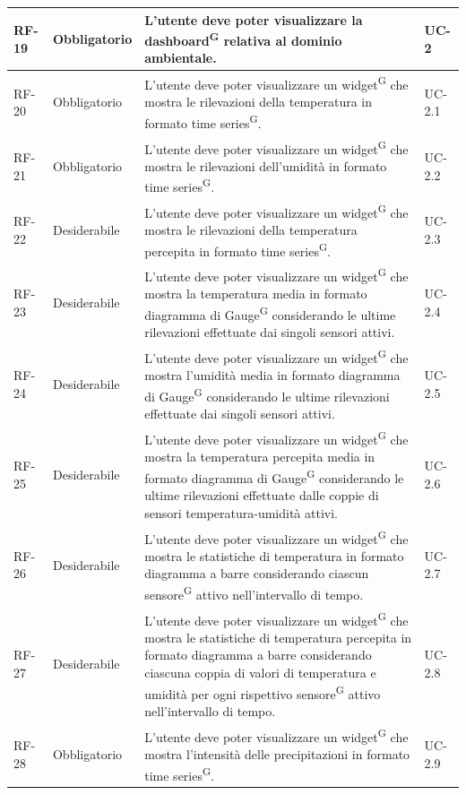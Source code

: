 \documentclass[8pt]{article}
\newcommand{\glossterm}[1]{#1\textsuperscript{G}} %
\begin{document}
\begin{longtable}{|>{\centering\arraybackslash}p{1.2cm}|>{\centering\arraybackslash}p{2cm}|>{\centering\arraybackslash}p{8.5cm}|>{\centering\arraybackslash}p{3cm}|}
            RF-19 & Obbligatorio & L'utente deve poter visualizzare la \glossterm{dashboard} relativa al dominio ambientale. & UC-2 \\ \hline
            RF-20 & Obbligatorio & L'utente deve poter visualizzare un \glossterm{widget} che mostra le rilevazioni della temperatura in formato \glossterm{time series}. & UC-2.1 \\ \hline
            RF-21 & Obbligatorio & L'utente deve poter visualizzare un \glossterm{widget} che mostra le rilevazioni dell'umidità in formato \glossterm{time series}. & UC-2.2 \\ \hline
            RF-22 & Desiderabile & L'utente deve poter visualizzare un \glossterm{widget} che mostra le rilevazioni della temperatura percepita in formato \glossterm{time series}. & UC-2.3 \\ \hline
            RF-23 & Desiderabile & L'utente deve poter visualizzare un \glossterm{widget} che mostra la temperatura media in formato diagramma di \glossterm{Gauge} considerando le ultime rilevazioni effettuate dai singoli sensori attivi. & UC-2.4 \\ \hline
            RF-24 & Desiderabile & L'utente deve poter visualizzare un \glossterm{widget} che mostra l'umidità media in formato diagramma di \glossterm{Gauge} considerando le ultime rilevazioni effettuate dai singoli sensori attivi. & UC-2.5 \\ \hline
            RF-25 & Desiderabile & L'utente deve poter visualizzare un \glossterm{widget} che mostra la temperatura percepita media in formato diagramma di \glossterm{Gauge} considerando le ultime rilevazioni effettuate dalle coppie di sensori temperatura-umidità attivi. & UC-2.6 \\ \hline
            RF-26 & Desiderabile & L'utente deve poter visualizzare un \glossterm{widget} che mostra le statistiche di temperatura in formato diagramma a barre considerando ciascun \glossterm{sensore} attivo nell'intervallo di tempo. & UC-2.7 \\ \hline
            RF-27 & Desiderabile & L'utente deve poter visualizzare un \glossterm{widget} che mostra le statistiche di temperatura percepita in formato diagramma a barre considerando ciascuna coppia di valori di temperatura e umidità per ogni rispettivo \glossterm{sensore} attivo nell'intervallo di tempo. & UC-2.8 \\ \hline
            RF-28 & Obbligatorio & L'utente deve poter visualizzare un \glossterm{widget} che mostra l'intensità delle precipitazioni in formato \glossterm{time series}. & UC-2.9 \\ \hline

\end{longtable}
\end{document}
